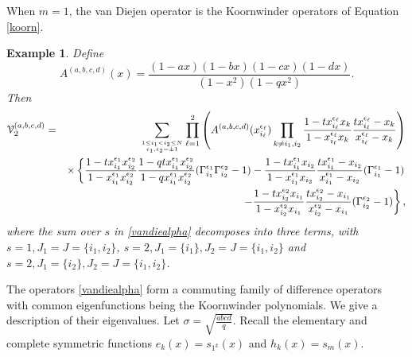 \documentclass[12pt]{amsart}
\newtheorem{example}[thm]{Example}
\numberwithin{equation}{section}
\begin{document}
When $m=1$, the van Diejen operator is the Koornwinder operators of Equation \eqref{koorn}.
\begin{example} 
Define
%
\begin{equation}\label{defAabcd}
A^{(a,b,c,d)}(x)=\frac{(1-ax)(1-bx)(1-cx)(1-dx)}{(1-x^2)(1-q x^2)}.\end{equation}
%
%
%
%
%
%
Then
\begin{eqnarray*}
{\mathcal V}_2^{(a,b,c,d)}&=&\sum_{1\leq i_1<i_2\leq N\atop \epsilon_1,\epsilon_2=\pm 1}\prod_{\ell=1}^2\left(
A^{(a,b,c,d)}(x_{i_\ell}^{\epsilon_\ell})
\prod_{k\neq i_1,i_2} \frac{1-t x_{i_\ell}^{\epsilon_\ell}x_k}{1-x_{i_\ell}^{\epsilon_\ell}x_k}
 \frac{t x_{i_\ell}^{\epsilon_\ell}-x_k}{x_{i_\ell}^{\epsilon_\ell}-x_k}\right)\\
&&\times \left\{ 
\frac{1-t x_{i_1}^{\epsilon_1}x_{i_2}^{\epsilon_2}}{1-x_{i_1}^{\epsilon_1}x_{i_2}^{\epsilon_2}}\frac{1-q t x_{i_1}^{\epsilon_1}x_{i_2}^{\epsilon_2}}{1-q x_{i_1}^{\epsilon_1}x_{i_2}^{\epsilon_2}}
(\Gamma_{i_1}^{\epsilon_1}\Gamma_{i_2}^{\epsilon_2}-1) -  \frac{1-t x_{i_1}^{\epsilon_1}x_{i_2}}{1-x_{i_1}^{\epsilon_1}x_{i_2}}
 \frac{t x_{i_1}^{\epsilon_1}-x_{i_2}}{x_{i_1}^{\epsilon_1}-x_{i_2}}(\Gamma_{i_1}^{\epsilon_1}-1)\right. \\
 && \qquad\qquad\qquad\left. - \frac{1-t x_{i_2}^{\epsilon_2}x_{i_1}}{1-x_{i_2}^{\epsilon_2}x_{i_1}}
 \frac{t x_{i_2}^{\epsilon_2}-x_{i_1}}{x_{i_2}^{\epsilon_2}-x_{i_1}} (\Gamma_{i_2}^{\epsilon_2}-1) \right\},
\end{eqnarray*}
where the sum over $s$ in \eqref{vandiealpha} decomposes into three terms, with $s=1, J_1=J=\{i_1,i_2\}$, 
$s=2, J_1=\{i_1\}, J_2=J=\{i_1,i_2\}$ and $s=2, J_1=\{i_2\}, J_2=J=\{i_1,i_2\}$.

%
%
%
%
%
%
%
%
%
%
%
%
%
%
%
%
%
%
%
%
%
%
%
%
%
%
%
%
%
\end{example}


The operators \eqref{vandiealpha} form a commuting family of difference operators
%
with common eigenfunctions being the Koornwinder polynomials.
%
We  give a description of their eigenvalues. 
Let $\sigma =\sqrt{\frac{abcd}{q}}$. 
Recall the elementary and complete symmetric functions $e_k(x)=s_{1^k}(x)$
and $h_k(x)=s_{m}(x)$.
%
%
%
%
\end{document}
